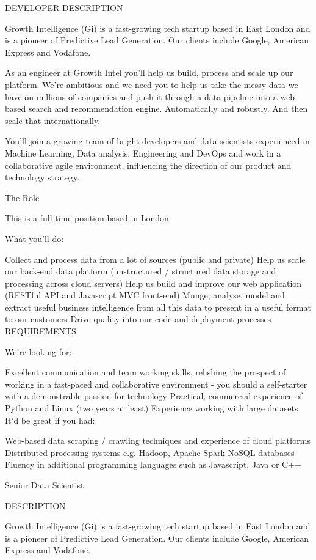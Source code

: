 
DEVELOPER
DESCRIPTION

Growth Intelligence (Gi) is a fast-growing tech startup based in East London and is a pioneer of
Predictive Lead Generation.  Our clients include Google, American Express and Vodafone.

As an engineer at Growth Intel you'll help us build, process and scale up our platform. We're
ambitious and we need you to help us take the messy data we have on millions of companies and push
it through a data pipeline into a web based search and recommendation engine. Automatically and
robustly. And then scale that internationally.

You'll join a growing team of bright developers and data scientists experienced in Machine
Learning, Data analysis, Engineering and DevOps and work in a collaborative agile environment,
influencing the direction of our product and technology strategy.

The Role

This is a full time position based in London.

What you’ll do:

Collect and process data from a lot of sources (public and private)
Help us scale our back-end data platform (unstructured / structured data storage and processing
across cloud servers)
Help us build and improve our web application (RESTful API and Javascript MVC front-end)
Munge, analyse, model and extract useful business intelligence from all this data to present in a
useful format to our customers
Drive quality into our code and deployment processes
REQUIREMENTS

We're looking for:

Excellent communication and team working skills, relishing the prospect of working in a fast-paced
and collaborative environment - you should a self-starter with a demonstrable passion for
technology
Practical, commercial experience of Python and Linux (two years at least)
Experience working with large datasets
It'd be great if you had:

Web-based data scraping / crawling techniques and experience of cloud platforms
Distributed processing systems e.g. Hadoop, Apache Spark
NoSQL databases
Fluency in additional programming languages such as Javascript, Java or C++



Senior Data Scientist

DESCRIPTION

Growth Intelligence (Gi) is a fast-growing tech startup based in East London and is a pioneer of
Predictive Lead Generation.  Our clients include Google, American Express and Vodafone.

